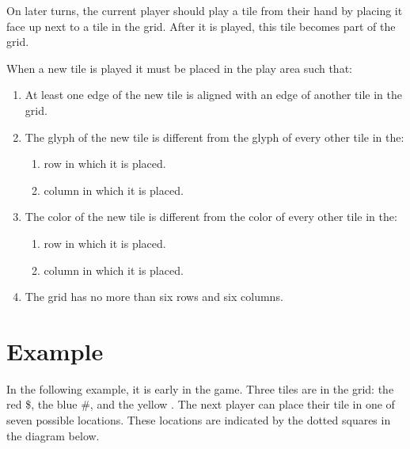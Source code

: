 \documentclass[a4paper, 10pt, notumble]{leaflet}
\newcommand{\smallpound}{{\setmainfont{Comic Neue-Bold} \large \#}}
\newcommand{\smallampersand}{{\setmainfont{Comic Neue-Bold} \large \$}}
\newcommand{\smallasterisk}{{\setmainfont{Quicksand-Bold} \Huge \raisebox{-0.25ex}{\textasteriskcentered{}}}}
\begin{document}
On later turns, the current player should play a tile from their hand by placing it face up next to a tile in the grid. After it is played, this tile becomes part of the grid.

When a new tile is played it must be placed in the play area such that:
\begin{enumerate}
  \item At least one edge of the new tile is aligned with an edge of another tile in the grid.
  \item The glyph of the new tile is different from the glyph of every other tile in the:
  \begin{enumerate}
  	\item row in which it is placed.
    	\item column in which it is placed.
  \end{enumerate}
  \item The color of the new tile is different from the color of every other tile in the:
  \begin{enumerate}
  	\item row in which it is placed.
    \item column in which it is placed.
  \end{enumerate}
  \item The grid has no more than six rows and six columns.
\end{enumerate}

\newpage

\section{Example}
In the following example,
it is early in the game. Three tiles are in the grid: the red \smallampersand, the blue \smallpound, and the yellow \smallasterisk.  The next player can place their tile in one of seven possible locations. These locations are indicated by the dotted squares in the diagram below.
\end{document}
